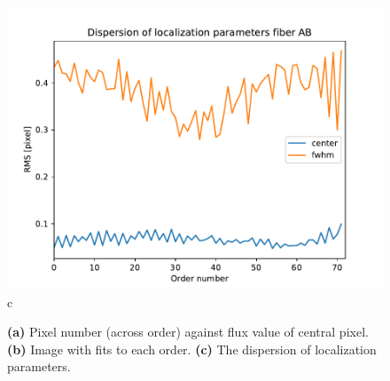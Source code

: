 \begin{figure}
\begin{center}
\begin{minipage}{.495\textwidth}
\begin{center}
\includegraphics[width=\textwidth]{Figures/cal_loc_RAW_spirou_3.pdf}
c
\end{center}
\end{minipage}%
\end{center}

\caption{\textbf{(a)} Pixel number (across order) against flux value of central pixel. \textbf{(b)} Image with fits to each order. \textbf{(c)} The dispersion of localization parameters. \label{figure:cal_loc_RAW_spirou}}
\end{figure}
